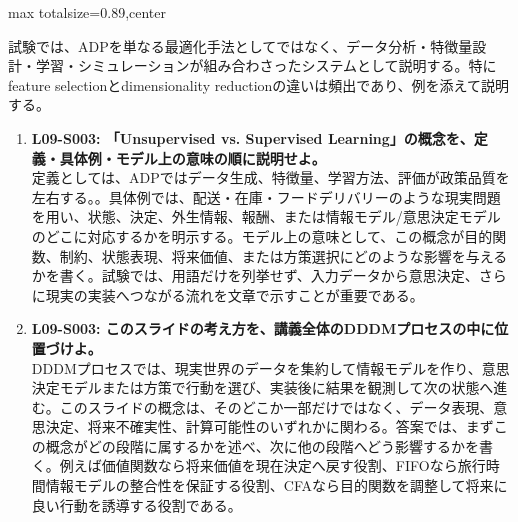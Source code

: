 \begin{minipage}[t]{0.58\textwidth}
\begin{adjustbox}{max totalsize={\textwidth}{0.89\textheight},center}
\begin{minipage}{\textwidth}
試験では、ADPを単なる最適化手法としてではなく、データ分析・特徴量設計・学習・シミュレーションが組み合わさったシステムとして説明する。特にfeature selectionとdimensionality reductionの違いは頻出であり、例を添えて説明する。\par{}\begin{enumerate}\item \textbf{L09-S003: 「Unsupervised vs. Supervised Learning」の概念を、定義・具体例・モデル上の意味の順に説明せよ。}\\定義としては、ADPではデータ生成、特徴量、学習方法、評価が政策品質を左右する。。具体例では、配送・在庫・フードデリバリーのような現実問題を用い、状態、決定、外生情報、報酬、または情報モデル/意思決定モデルのどこに対応するかを明示する。モデル上の意味として、この概念が目的関数、制約、状態表現、将来価値、または方策選択にどのような影響を与えるかを書く。試験では、用語だけを列挙せず、入力データから意思決定、さらに現実の実装へつながる流れを文章で示すことが重要である。\item \textbf{L09-S003: このスライドの考え方を、講義全体のDDDMプロセスの中に位置づけよ。}\\DDDMプロセスでは、現実世界のデータを集約して情報モデルを作り、意思決定モデルまたは方策で行動を選び、実装後に結果を観測して次の状態へ進む。このスライドの概念は、そのどこか一部だけではなく、データ表現、意思決定、将来不確実性、計算可能性のいずれかに関わる。答案では、まずこの概念がどの段階に属するかを述べ、次に他の段階へどう影響するかを書く。例えば価値関数なら将来価値を現在決定へ戻す役割、FIFOなら旅行時間情報モデルの整合性を保証する役割、CFAなら目的関数を調整して将来に良い行動を誘導する役割である。\end{enumerate}
\end{minipage}
\end{adjustbox}
\end{minipage}



